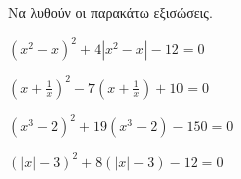 Να λυθούν οι παρακάτω εξισώσεις.
\begin{alist}
\item $ \left(x^2-x\right)^2+4\left|x^2-x\right|-12=0 $
\item $ \left(x+\frac{1}{x}\right)^2-7\left(x+\frac{1}{x}\right)+10=0 $
\item $ \left(x^3-2\right)^2+19\left(x^3-2\right)-150=0 $
\item $ \left(|x|-3\right)^2+8\left(|x|-3\right)-12=0 $
\end{alist}
